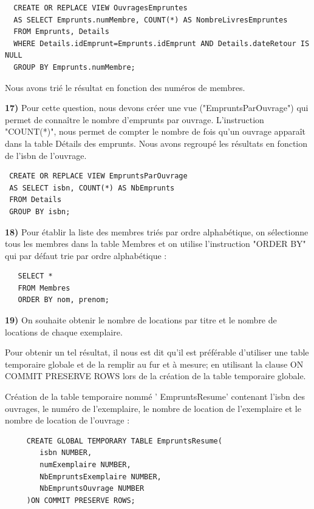 \documentclass[a4paper,12pt]{article}
\begin{document}
  \begin{lstlisting}
  CREATE OR REPLACE VIEW OuvragesEmpruntes 
  AS SELECT Emprunts.numMembre, COUNT(*) AS NombreLivresEmpruntes 
  FROM Emprunts, Details 
  WHERE Details.idEmprunt=Emprunts.idEmprunt AND Details.dateRetour IS NULL 
  GROUP BY Emprunts.numMembre;
\end{lstlisting}

Nous avons trié le résultat en fonction des numéros de membres. 

  \textbf {17)}
   Pour cette question, nous devons créer une vue ("EmpruntsParOuvrage") qui permet de connaître le nombre d’emprunts par ouvrage. L'instruction "COUNT(*)", nous permet de compter le nombre de fois qu'un ouvrage apparaît dans la table Détails des emprunts. Nous avons regroupé les résultats en fonction de l'isbn de l'ouvrage. 
 \begin{lstlisting}
 CREATE OR REPLACE VIEW EmpruntsParOuvrage 
 AS SELECT isbn, COUNT(*) AS NbEmprunts 
 FROM Details 
 GROUP BY isbn;
 \end{lstlisting}
 
 
   \textbf {18)} 
   Pour établir la liste des membres triés par ordre    alphabétique, on sélectionne tous les membres dans la table Membres et on utilise l'instruction "ORDER BY" qui par défaut trie par ordre alphabétique : 
   \begin{lstlisting}
   SELECT * 
   FROM Membres 
   ORDER BY nom, prenom;
   \end{lstlisting}
   
 \clearpage
 
  \textbf {19)}
  On souhaite obtenir le nombre de locations par titre et le nombre de locations de chaque exemplaire.  
  
  Pour  obtenir  un  tel  résultat,  il  nous est dit qu'il est préférable  d’utiliser  une  table  temporaire  globale et de la  remplir  au  fur  et  à  mesure; en utilisant la  clause  ON  COMMIT  PRESERVE  ROWS  lors  de  la création de la table temporaire globale.
  
  Création de la table temporaire nommé ' EmpruntsResume' contenant l'isbn des ouvrages, le numéro de l'exemplaire, le nombre de location de l'exemplaire et le nombre de location de l'ouvrage : 
  
     \begin{lstlisting}
     CREATE GLOBAL TEMPORARY TABLE EmpruntsResume(
     	isbn NUMBER,
     	numExemplaire NUMBER,
     	NbEmpruntsExemplaire NUMBER,
     	NbEmpruntsOuvrage NUMBER
     )ON COMMIT PRESERVE ROWS;
     \end{lstlisting}
     
\end{document}
